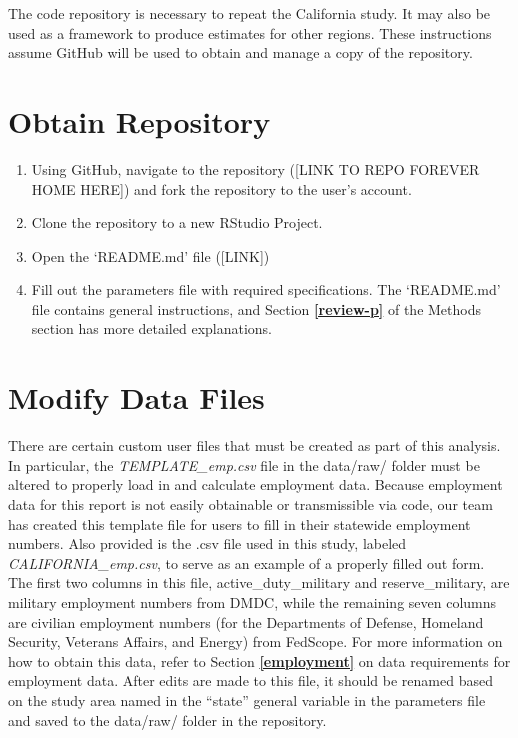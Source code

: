 \documentclass[
]{book}
\providecommand{\tightlist}{%
  \setlength{\itemsep}{0pt}\setlength{\parskip}{0pt}}
\begin{document}
The code repository is necessary to repeat the California study. It may also be used as a framework to produce estimates for other regions. These instructions assume GitHub will be used to obtain and manage a copy of the repository.

\hypertarget{get-repo}{%
\section{Obtain Repository}\label{get-repo}}

\begin{enumerate}
\def\labelenumi{\arabic{enumi}.}
\tightlist
\item
  Using GitHub, navigate to the repository ({[}LINK TO REPO FOREVER HOME HERE{]}) and fork the repository to the user's account.
\item
  Clone the repository to a new RStudio Project.
\item
  Open the `README.md' file ({[}LINK{]})
\item
  Fill out the parameters file with required specifications. The `README.md' file contains general instructions, and Section \textbf{\ref{review-p}} of the Methods section has more detailed explanations.
\end{enumerate}

\hypertarget{modify-data}{%
\section{Modify Data Files}\label{modify-data}}

There are certain custom user files that must be created as part of this analysis. In particular, the \emph{TEMPLATE\_emp.csv} file in the data/raw/ folder must be altered to properly load in and calculate employment data. Because employment data for this report is not easily obtainable or transmissible via code, our team has created this template file for users to fill in their statewide employment numbers. Also provided is the .csv file used in this study, labeled \emph{CALIFORNIA\_emp.csv}, to serve as an example of a properly filled out form. The first two columns in this file, active\_duty\_military and reserve\_military, are military employment numbers from DMDC, while the remaining seven columns are civilian employment numbers (for the Departments of Defense, Homeland Security, Veterans Affairs, and Energy) from FedScope. For more information on how to obtain this data, refer to Section \textbf{\ref{employment}} on data requirements for employment data. After edits are made to this file, it should be renamed based on the study area named in the ``state'' general variable in the parameters file and saved to the data/raw/ folder in the repository.
\end{document}
